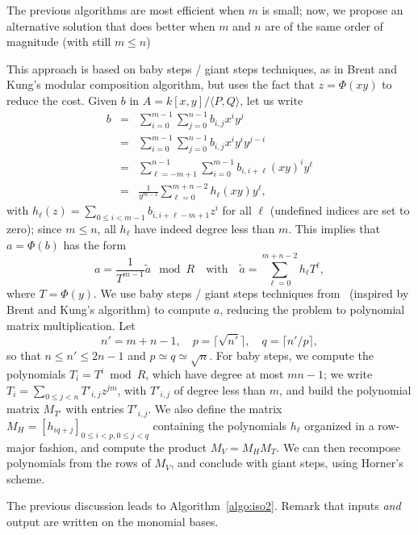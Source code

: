 \documentclass{sig-alternate}
\newcounter{algo}
\newcommand{\ang}[1]{\langle#1\rangle}
\begin{document}
  The previous
algorithms are most efficient when $m$ is small; now, we propose an
alternative solution that does better when $m$ and $n$ are of the same
order of magnitude (with still $m \le n$)

This approach is based on baby steps / giant steps techniques, as in
Brent and Kung's modular composition algorithm, but uses the fact that
$z=\Phi(xy)$ to reduce the cost. Given $b$ in $A=k[x,y]/\ang{P,Q}$,
let us write
\begin{eqnarray*}
b&=&\sum_{i=0}^{m-1}\sum_{j=0}^{n-1} b_{i,j}x^i y^j\\
&=&\sum_{i=0}^{m-1}\sum_{j=0}^{n-1} b_{i,j}x^i y^i y^{j-i}\\
&=&\sum_{\ell=-m+1}^{n-1}\sum_{i=0}^{m-1} b_{i,i+\ell}(xy)^i y^\ell\\
&=&\frac{1}{y^{m-1}} \sum_{\ell=0}^{m+n-2} h_\ell(xy) y^\ell,
\end{eqnarray*}
with $h_\ell(z)=\sum_{0 \le i < m-1} b_{i,i+\ell-m+1} z^i$ for all
$\ell$ (undefined indices are set to zero); since $m \le n$, all
$h_\ell$ have indeed degree less than $m$. This implies that
$a=\Phi(b)$ has the form
$$a = \frac{1}{T^{m-1}}\widetilde{a} \mod R\quad\text{with}\quad
\widetilde{a}=\sum_{\ell=0}^{m+n-2} h_\ell T^\ell,$$ where
$T=\Phi(y)$.  We use baby steps / giant steps techniques
from~\cite{LeMeSc13} (inspired by Brent and Kung's algorithm) to
compute $a$, reducing the problem to polynomial matrix
multiplication. Let
$$n'=m+n-1,\quad p=\lceil \sqrt {n'} \rceil,\quad q=\lceil
n'/p\rceil,$$ so that $n \le n' \le 2n-1$ and $p\simeq q \simeq
\sqrt{n}$.  For baby steps, we compute the polynomials $T_i=T^i \bmod
R$, which have degree at most $mn-1$; we write $T_i = \sum_{0 \le j <
  n} T'_{i,j} z^{jm}$, with $T'_{i,j}$ of degree less than $m$, and
build the polynomial matrix $M_{T'}$ with entries $T'_{i,j}$.  We also
define the matrix $M_H=[h_{iq+j}]_{0 \le i <p, 0 \le j < q}$
containing the polynomials $h_\ell$ organized in a row-major fashion,
and compute the product $M_V=M_H M_T$. We can then recompose
polynomials from the rows of $M_V$, and conclude with giant steps,
using Horner's scheme.

The previous discussion leads to Algorithm~\ref{algo:iso2}. Remark
that inputs {\em and} output are written on the monomial bases.
\end{document}

